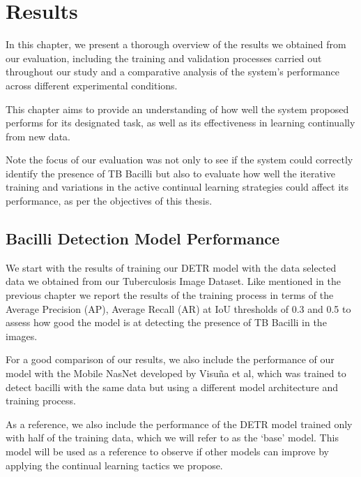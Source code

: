 \documentclass[../main.tex]{subfiles}
\begin{document}
\chapter{Results} \label{chap:results}


\vspace{-0.5cm}
In this chapter, we present a thorough overview of the results we obtained from our evaluation, including the training and validation processes carried out throughout our study and a comparative analysis of the system's performance across different experimental conditions. 

This chapter aims to provide an understanding of how well the system proposed performs for its designated task, as well as its effectiveness in learning continually from new data. 

Note the focus of our evaluation was not only to see if the system could correctly identify the presence of TB Bacilli but also to evaluate how well the iterative training and variations in the active continual learning strategies could affect its performance, as per the objectives of this thesis.

\section{Bacilli Detection Model Performance} \label{results:training}

We start with the results of training our DETR model with the data selected data we obtained from our Tuberculosis Image Dataset. Like mentioned in the previous chapter we report the results of the training process in terms of the Average Precision (AP), Average Recall (AR) at IoU thresholds of 0.3 and 0.5 to assess how good the model is at detecting the presence of TB Bacilli in the images.

For a good comparison of our results, we also include the performance of our model with the Mobile NasNet developed by Visuña et al, which was trained to detect bacilli with the same data but using a different model architecture and training process. 

As a reference, we also include the performance of the DETR model trained only with half of the training data, which we will refer to as the `base' model. This model will be used as a reference to observe if other models can improve by applying the continual learning tactics we propose.
\end{document}
